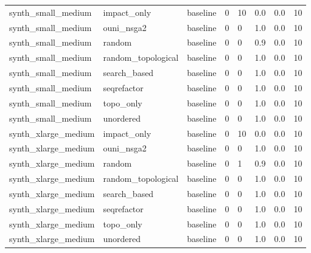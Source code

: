 \begin{table}[t]
\begin{tabular}{llllllll}
synth\_small\_medium & impact\_only & baseline & 0 & 10 & 0.0 & 0.0 & 10 \\
synth\_small\_medium & ouni\_nsga2 & baseline & 0 & 0 & 1.0 & 0.0 & 10 \\
synth\_small\_medium & random & baseline & 0 & 0 & 0.9 & 0.0 & 10 \\
synth\_small\_medium & random\_topological & baseline & 0 & 0 & 1.0 & 0.0 & 10 \\
synth\_small\_medium & search\_based & baseline & 0 & 0 & 1.0 & 0.0 & 10 \\
synth\_small\_medium & seqrefactor & baseline & 0 & 0 & 1.0 & 0.0 & 10 \\
synth\_small\_medium & topo\_only & baseline & 0 & 0 & 1.0 & 0.0 & 10 \\
synth\_small\_medium & unordered & baseline & 0 & 0 & 1.0 & 0.0 & 10 \\
synth\_xlarge\_medium & impact\_only & baseline & 0 & 10 & 0.0 & 0.0 & 10 \\
synth\_xlarge\_medium & ouni\_nsga2 & baseline & 0 & 0 & 1.0 & 0.0 & 10 \\
synth\_xlarge\_medium & random & baseline & 0 & 1 & 0.9 & 0.0 & 10 \\
synth\_xlarge\_medium & random\_topological & baseline & 0 & 0 & 1.0 & 0.0 & 10 \\
synth\_xlarge\_medium & search\_based & baseline & 0 & 0 & 1.0 & 0.0 & 10 \\
synth\_xlarge\_medium & seqrefactor & baseline & 0 & 0 & 1.0 & 0.0 & 10 \\
synth\_xlarge\_medium & topo\_only & baseline & 0 & 0 & 1.0 & 0.0 & 10 \\
synth\_xlarge\_medium & unordered & baseline & 0 & 0 & 1.0 & 0.0 & 10 \\
\bottomrule
\end{tabular}
\end{table}
